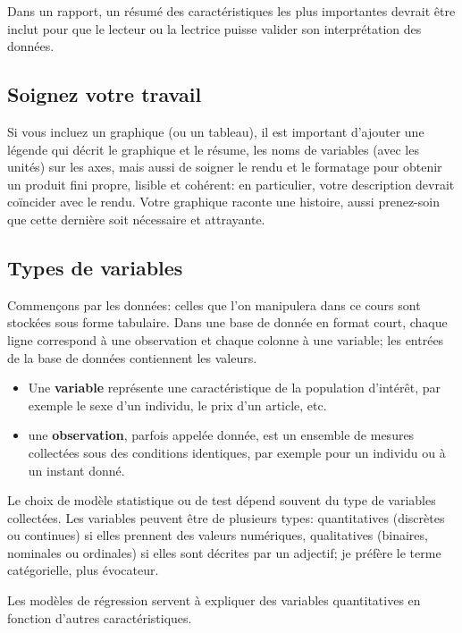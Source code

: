 \documentclass[
  11pt,
  letterpaper,
]{book}
\providecommand{\tightlist}{%
  \setlength{\itemsep}{0pt}\setlength{\parskip}{0pt}}
\theoremstyle{definition}
\theoremstyle{definition}
\theoremstyle{definition}
\theoremstyle{remark}
\begin{document}
Dans un rapport, un résumé des caractéristiques les plus importantes devrait être inclut pour que le lecteur ou la lectrice puisse valider son interprétation des données.

\hypertarget{soignez-votre-travail}{%
\subsection{Soignez votre travail}\label{soignez-votre-travail}}

Si vous incluez un graphique (ou un tableau), il est important d'ajouter une légende qui décrit le graphique et le résume, les noms de variables (avec les unités) sur les axes, mais aussi de soigner le rendu et le formatage pour obtenir un produit fini propre, lisible et cohérent: en particulier, votre description devrait coïncider avec le rendu. Votre graphique raconte une histoire, aussi prenez-soin que cette dernière soit nécessaire et attrayante.

\hypertarget{types-de-variables}{%
\subsection{Types de variables}\label{types-de-variables}}

Commençons par les données: celles que l'on manipulera dans ce cours sont stockées sous forme tabulaire. Dans une base de donnée en format court, chaque ligne correspond à une observation et chaque colonne à une variable; les entrées de la base de données contiennent les valeurs.

\begin{itemize}
\tightlist
\item
  Une \textbf{variable} représente une caractéristique de la population d'intérêt, par exemple le sexe d'un individu, le prix d'un article, etc.
\item
  une \textbf{observation}, parfois appelée donnée, est un ensemble de mesures collectées sous des conditions identiques, par exemple pour un individu ou à un instant donné.
\end{itemize}

Le choix de modèle statistique ou de test dépend souvent du type de variables collectées. Les variables peuvent être de plusieurs types: quantitatives (discrètes ou continues) si elles prennent des valeurs numériques, qualitatives (binaires, nominales ou ordinales) si elles sont décrites par un adjectif; je préfère le terme catégorielle, plus évocateur.

Les modèles de régression servent à expliquer des variables quantitatives en fonction d'autres caractéristiques.
\end{document}
